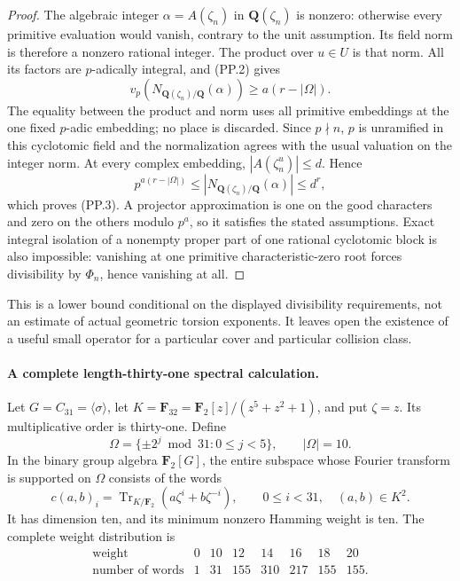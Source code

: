 \documentclass[11pt,a4paper]{article}
\begin{document}
\begin{proof}
The algebraic integer $\alpha=A(\zeta_n)$ in
$\mathbf Q(\zeta_n)$ is nonzero: otherwise every primitive
evaluation would vanish, contrary to the unit assumption.
Its field norm is therefore a nonzero rational integer.
The product over $u\in U$ is that norm. All its factors are
$p$-adically integral, and (PP.2) gives
\[
 v_p\!\left(N_{\mathbf Q(\zeta_n)/\mathbf Q}(\alpha)\right)
                         \ge a(r-|\Omega|).
 \tag{PP.4}
\]
The equality between the product and norm uses all primitive
embeddings at the one fixed $p$-adic embedding; no place is
discarded. Since $p\nmid n$, $p$ is unramified in this cyclotomic
field and the normalization agrees with the usual valuation on
the integer norm. At every complex embedding,
$|A(\zeta_n^u)|\le d$. Hence
\[
 p^{a(r-|\Omega|)}
       \le\left|N_{\mathbf Q(\zeta_n)/\mathbf Q}(\alpha)\right|
       \le d^r,
\]
which proves (PP.3). A projector approximation is one on the
good characters and zero on the others modulo $p^a$, so it
satisfies the stated assumptions. Exact integral isolation of
a nonempty proper part of one rational cyclotomic block is
also impossible: vanishing at one primitive characteristic-zero
root forces divisibility by $\Phi_n$, hence vanishing at all.
\end{proof}

This is a lower bound conditional on the displayed divisibility
requirements, not an estimate of actual geometric torsion
exponents. It leaves open the existence of a useful small
operator for a particular cover and particular collision class.

\paragraph{A complete length-thirty-one spectral calculation.}
Let $G=C_{31}=\langle\sigma\rangle$, let
$K=\mathbf F_{32}=\mathbf F_2[z]/(z^5+z^2+1)$, and put
$\zeta=z$. Its multiplicative order is thirty-one. Define
\[
 \Omega=\{\pm2^j\bmod31:0\le j<5\},\qquad |\Omega|=10.
 \tag{PP.5}
\]
In the binary group algebra $\mathbf F_2[G]$, the entire
subspace whose Fourier transform is supported on $\Omega$
consists of the words
\[
 c(a,b)_i=\operatorname{Tr}_{K/\mathbf F_2}
             (a\zeta^i+b\zeta^{-i}),
       \qquad 0\le i<31,\quad (a,b)\in K^2.
 \tag{PP.6}
\]
It has dimension ten, and its minimum nonzero Hamming weight
is ten. The complete weight distribution is
\[
\begin{array}{c|rrrrrrr}
\text{weight}&0&10&12&14&16&18&20\\
\hline
\text{number of words}&1&31&155&310&217&155&155.
\end{array}
 \tag{PP.7}
\]
\end{document}
